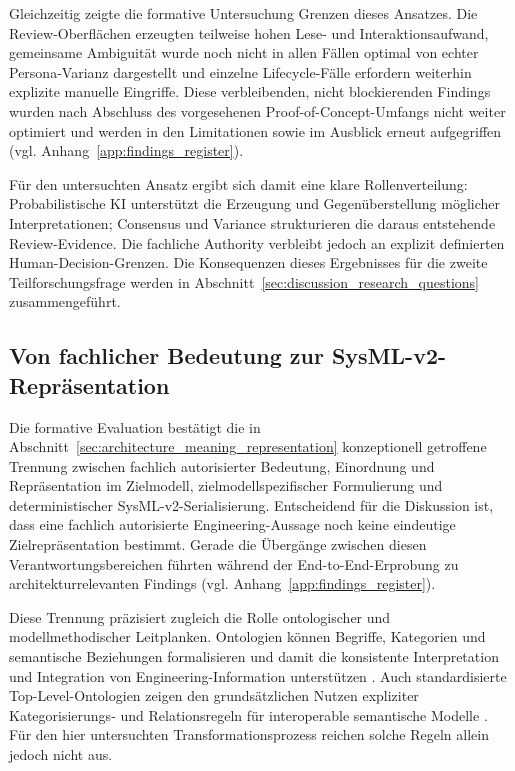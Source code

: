 Gleichzeitig zeigte die formative Untersuchung Grenzen dieses Ansatzes. Die
Review-Oberflächen erzeugten teilweise hohen Lese- und Interaktionsaufwand,
gemeinsame Ambiguität wurde noch nicht in allen Fällen optimal von echter
Persona-Varianz dargestellt und einzelne Lifecycle-Fälle erfordern weiterhin
explizite manuelle Eingriffe. Diese verbleibenden, nicht blockierenden
Findings wurden nach Abschluss des vorgesehenen Proof-of-Concept-Umfangs nicht
weiter optimiert und werden in den Limitationen sowie im Ausblick erneut
aufgegriffen (vgl. Anhang~\ref{app:findings_register}).

Für den untersuchten Ansatz ergibt sich damit eine klare Rollenverteilung:
Probabilistische KI unterstützt die Erzeugung und Gegenüberstellung
möglicher Interpretationen; Consensus und Variance strukturieren die daraus
entstehende Review-Evidence. Die fachliche Authority verbleibt jedoch an
explizit definierten Human-Decision-Grenzen. Die Konsequenzen dieses
Ergebnisses für die zweite Teilforschungsfrage werden in
Abschnitt~\ref{sec:discussion_research_questions} zusammengeführt.

\subsection{Von fachlicher Bedeutung zur SysML-v2-Repräsentation}
\label{sec:discussion_model_formation}

Die formative Evaluation bestätigt die in
Abschnitt~\ref{sec:architecture_meaning_representation} konzeptionell
getroffene Trennung zwischen fachlich autorisierter Bedeutung, Einordnung und
Repräsentation im Zielmodell, zielmodellspezifischer Formulierung und
deterministischer SysML-v2-Serialisierung. Entscheidend für die Diskussion ist, dass eine
fachlich autorisierte Engineering-Aussage noch keine eindeutige
Zielrepräsentation bestimmt. Gerade die Übergänge zwischen diesen
Verantwortungsbereichen führten während der End-to-End-Erprobung zu
architekturrelevanten Findings
(vgl. Anhang~\ref{app:findings_register}).

Diese Trennung präzisiert zugleich die Rolle ontologischer und
modellmethodischer Leitplanken. Ontologien können Begriffe, Kategorien und
semantische Beziehungen formalisieren und damit die konsistente Interpretation
und Integration von Engineering-Information unterstützen
\cite{OrellanaMandrick2019,Lu2022,Kulvatunyou2022}. Auch standardisierte
Top-Level-Ontologien zeigen den grundsätzlichen Nutzen expliziter
Kategorisierungs- und Relationsregeln für interoperable semantische Modelle
\cite{ISO21838_2_2021}. Für den hier untersuchten Transformationsprozess
reichen solche Regeln allein jedoch nicht aus.


